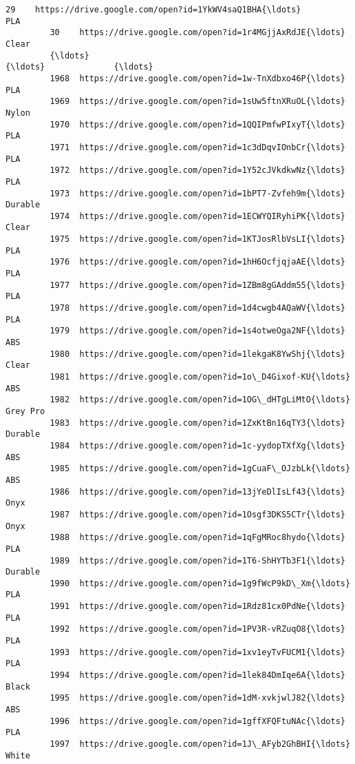 \documentclass[11pt]{article}
\begin{document}
\begin{Verbatim}[commandchars=\\\{\}]
         29    https://drive.google.com/open?id=1YkWV4saQ1BHA{\ldots}              PLA   
         30    https://drive.google.com/open?id=1r4MGjjAxRdJE{\ldots}            Clear   
         {\ldots}                                                 {\ldots}              {\ldots}   
         1968  https://drive.google.com/open?id=1w-TnXdbxo46P{\ldots}              PLA   
         1969  https://drive.google.com/open?id=1sUw5ftnXRuOL{\ldots}            Nylon   
         1970  https://drive.google.com/open?id=1QQIPmfwPIxyT{\ldots}              PLA   
         1971  https://drive.google.com/open?id=1c3dDqvIOnbCr{\ldots}              PLA   
         1972  https://drive.google.com/open?id=1Y52cJVkdkwNz{\ldots}              PLA   
         1973  https://drive.google.com/open?id=1bPT7-Zvfeh9m{\ldots}          Durable   
         1974  https://drive.google.com/open?id=1ECWYQIRyhiPK{\ldots}            Clear   
         1975  https://drive.google.com/open?id=1KTJosRlbVsLI{\ldots}              PLA   
         1976  https://drive.google.com/open?id=1hH6OcfjqjaAE{\ldots}              PLA   
         1977  https://drive.google.com/open?id=1ZBm8gGAddm55{\ldots}              PLA   
         1978  https://drive.google.com/open?id=1d4cwgb4AQaWV{\ldots}              PLA   
         1979  https://drive.google.com/open?id=1s4otweOga2NF{\ldots}              ABS   
         1980  https://drive.google.com/open?id=1lekgaK8YwShj{\ldots}            Clear   
         1981  https://drive.google.com/open?id=1o\_D4Gixof-KU{\ldots}              ABS   
         1982  https://drive.google.com/open?id=1OG\_dHTgLiMtO{\ldots}         Grey Pro   
         1983  https://drive.google.com/open?id=1ZxKtBn16qTY3{\ldots}          Durable   
         1984  https://drive.google.com/open?id=1c-yydopTXfXg{\ldots}              ABS   
         1985  https://drive.google.com/open?id=1gCuaF\_OJzbLk{\ldots}              ABS   
         1986  https://drive.google.com/open?id=13jYeDlIsLf43{\ldots}             Onyx   
         1987  https://drive.google.com/open?id=1Osgf3DKS5CTr{\ldots}             Onyx   
         1988  https://drive.google.com/open?id=1qFgMRoc8hydo{\ldots}              PLA   
         1989  https://drive.google.com/open?id=1T6-ShHYTb3F1{\ldots}          Durable   
         1990  https://drive.google.com/open?id=1g9fWcP9kD\_Xm{\ldots}              PLA   
         1991  https://drive.google.com/open?id=1Rdz81cx0PdNe{\ldots}              PLA   
         1992  https://drive.google.com/open?id=1PV3R-vRZuqO8{\ldots}              PLA   
         1993  https://drive.google.com/open?id=1xv1eyTvFUCM1{\ldots}              PLA   
         1994  https://drive.google.com/open?id=1lek84DmIqe6A{\ldots}            Black   
         1995  https://drive.google.com/open?id=1dM-xvkjwlJ82{\ldots}              ABS   
         1996  https://drive.google.com/open?id=1gffXFQFtuNAc{\ldots}              PLA   
         1997  https://drive.google.com/open?id=1J\_AFyb2GhBHI{\ldots}            White   
         

\end{Verbatim}
\end{document}
